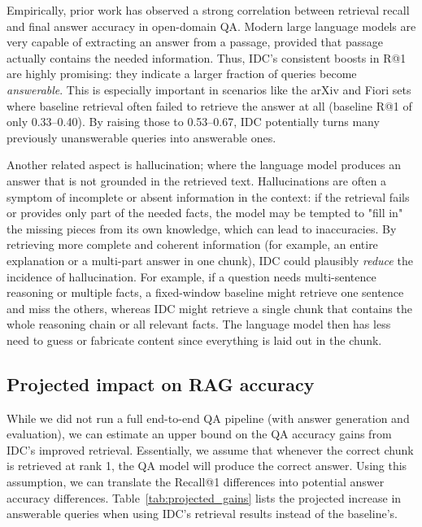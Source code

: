 \documentclass[12pt,a4paper]{report}
\begin{document}
Empirically, prior work has observed a strong correlation between retrieval recall and final answer accuracy in open-domain QA. Modern large language models are very capable of extracting an answer from a passage, provided that passage actually contains the needed information. Thus, IDC's consistent boosts in R@1 are highly promising: they indicate a larger fraction of queries become \textit{answerable}. This is especially important in scenarios like the arXiv and Fiori sets where baseline retrieval often failed to retrieve the answer at all (baseline R@1 of only 0.33--0.40). By raising those to 0.53--0.67, IDC potentially turns many previously unanswerable queries into answerable ones.

Another related aspect is hallucination; where the language model produces an answer that is not grounded in the retrieved text. Hallucinations are often a symptom of incomplete or absent information in the context: if the retrieval fails or provides only part of the needed facts, the model may be tempted to "fill in" the missing pieces from its own knowledge, which can lead to inaccuracies. By retrieving more complete and coherent information (for example, an entire explanation or a multi-part answer in one chunk), IDC could plausibly \textit{reduce} the incidence of hallucination. For example, if a question needs multi-sentence reasoning or multiple facts, a fixed-window baseline might retrieve one sentence and miss the others, whereas IDC might retrieve a single chunk that contains the whole reasoning chain or all relevant facts. The language model then has less need to guess or fabricate content since everything is laid out in the chunk.

\subsection{Projected impact on RAG accuracy}\label{sec:projected-rag-accuracy}

While we did not run a full end-to-end QA pipeline (with answer generation and evaluation), we can estimate an upper bound on the QA accuracy gains from IDC's improved retrieval. Essentially, we assume that whenever the correct chunk is retrieved at rank 1, the QA model will produce the correct answer. Using this assumption, we can translate the Recall@1 differences into potential answer accuracy differences. Table~\ref{tab:projected_gains} lists the projected increase in answerable queries when using IDC's retrieval results instead of the baseline's.
\end{document}
